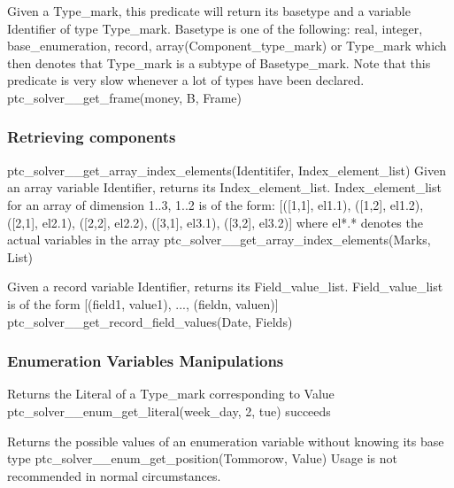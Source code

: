 \documentclass{article}
\begin{document}
\hspace{\parindent}
{Given a Type\_mark, this predicate will return its basetype and a
variable Identifier of type Type\_mark. Basetype is one of the following: real,
integer, base\_enumeration, record,
array(Component\_type\_mark) or Type\_mark which then denotes that Type\_mark is
a subtype of Basetype\_mark. Note that this predicate is very slow whenever a lot
of types have been declared.}
{ptc\_solver\_\_get\_frame(money, B, Frame)}
{}

\subsubsection{Retrieving components}

\hspace{\parindent}\pro
{ptc\_solver\_\_get\_array\_index\_elements(Identitifer, Index\_element\_list)}
    {Given an array variable Identifier, returns its Index\_element\_list.
Index\_element\_list for an array of dimension 1..3, 1..2 is of the form:
 [([1,1], el1.1), ([1,2], el1.2), ([2,1], el2.1), ([2,2], el2.2), ([3,1], el3.1),
([3,2],
 el3.2)] where el*.* denotes the actual variables in the array}
        {ptc\_solver\_\_get\_array\_index\_elements(Marks, List)}
        {}

    {Given a record variable Identifier, returns its Field\_value\_list.
Field\_value\_list is of the form [(field1, value1), ..., (fieldn, valuen)]}
        {ptc\_solver\_\_get\_record\_field\_values(Date, Fields)}
        {}

\subsubsection{Enumeration Variables Manipulations}

\hspace{\parindent}
        {Returns the Literal of a Type\_mark corresponding to Value}
        {ptc\_solver\_\_enum\_get\_literal(week\_day, 2, tue) succeeds}
        {}

        {Returns the possible values of an enumeration variable without knowing
its base type}
        {ptc\_solver\_\_enum\_get\_position(Tommorow, Value)}
        {Usage is not recommended in normal circumstances.}
\end{document}
